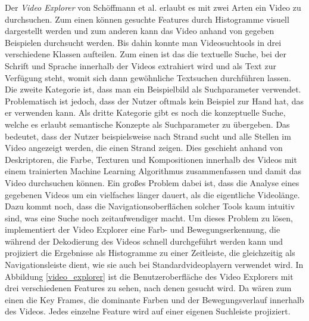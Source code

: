 \documentclass[11pt,a4paper]{report}
\begin{document}
Der \emph{Video Explorer} von Schöffmann et al. \cite{schoeffmann2010video} erlaubt es mit zwei Arten ein Video zu durchsuchen. Zum einen können gesuchte Features durch Histogramme visuell dargestellt werden und zum anderen kann das Video anhand von gegeben Beispielen durchsucht werden. Bis dahin konnte man Videosuchtools in drei verschiedene Klassen aufteilen. Zum einen ist das die textuelle Suche, bei der Schrift und Sprache innerhalb der Videos extrahiert wird und als Text zur Verfügung steht, womit sich dann gewöhnliche Textsuchen durchführen lassen. Die zweite Kategorie ist, dass man ein Beispielbild als Suchparameter verwendet. Problematisch ist jedoch, dass der Nutzer oftmals kein Beispiel zur Hand hat, das er verwenden kann. Als dritte Kategorie gibt es noch die konzeptuelle Suche, welche es erlaubt semantische Konzepte als Suchparameter zu übergeben. Das bedeutet, dass der Nutzer beispielsweise nach Strand sucht und alle Stellen im Video angezeigt werden, die einen Strand zeigen. Dies geschieht anhand von Deskriptoren, die Farbe, Texturen und Kompositionen innerhalb des Videos mit einem trainierten Machine Learning Algorithmus zusammenfassen und damit das Video durchsuchen können. Ein großes Problem dabei ist, dass die Analyse eines gegebenen Videos um ein vielfaches länger dauert, als die eigentliche Videolänge. Dazu kommt noch, dass die Navigationsoberflächen solcher Tools kaum intuitiv sind, was eine Suche noch zeitaufwendiger macht. Um dieses Problem zu lösen, implementiert der Video Explorer eine Farb- und Bewegungserkennung, die während der Dekodierung des Videos schnell durchgeführt werden kann und projiziert die Ergebnisse als Histogramme zu einer Zeitleiste, die gleichzeitig als Navigationsleiste dient, wie sie auch bei Standardvideoplayern verwendet wird. In Abbildung \ref{video_explorer} ist die Benutzeroberfläche des Video Explorers mit drei verschiedenen Features zu sehen, nach denen gesucht wird. Da wären zum einen die Key Frames, die dominante Farben und der Bewegungsverlauf innerhalb des Videos. Jedes einzelne Feature wird auf einer eigenen Suchleiste projiziert.
\end{document}

